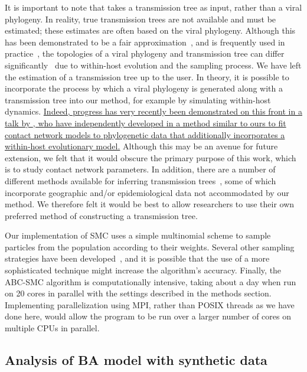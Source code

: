 It is important to note that  takes a transmission tree as
input, rather than a viral phylogeny. In reality, true transmission trees are
not available and must be estimated; these estimates are often based on the
viral phylogeny. Although this has been demonstrated to be a fair
approximation~\autocite[e.g.][]{leitner1996accurate}, and is frequently used in
practice~\autocite[e.g.][]{stadler2013uncovering}, the topologies of a viral
phylogeny and transmission tree can differ
significantly~\autocite{ypma2013relating, hall2015epidemic} due to within-host
evolution and the sampling process. We have left the estimation of a
transmission tree up to the user. In theory, it is possible to incorporate the
process by which a viral phylogeny is generated along with a transmission tree
into our method, for example by simulating within-host dynamics. {\color{blue}
\uline{Indeed, progress has very recently been demonstrated on this front in a
talk by \citeauthor{giardina2016inference}, who have independently developed in
a method similar to ours to fit contact network models to phylogenetic data
that additionally incorporates a within-host evolutionary model.}} Although
this may be an avenue for future extension, we felt that it would obscure the
primary purpose of this work, which is to study contact network parameters. In
addition, there are a number of different methods available for inferring
transmission trees~\autocite{didelot2014bayesian, ypma2012unravelling,
jombart2011reconstructing, cottam2008integrating, hall2015epidemic}, some of
which incorporate geographic and/or epidemiological data not accommodated by
our method. We therefore felt it would be best to allow researchers to use
their own preferred method of constructing a transmission tree.

Our implementation of \gls{SMC} uses a simple multinomial scheme to sample
particles from the population according to their weights. Several other
sampling strategies have been developed~\autocite{douc2005comparison}, and it
is possible that the use of a more sophisticated technique might increase the
algorithm's accuracy. Finally, the \gls{ABC}-\gls{SMC} algorithm is
computationally intensive, taking about a day when run on 20 cores in parallel
with the settings described in the methods section. Implementing
parallelization using MPI, rather than POSIX threads as we have done here,
would allow the program to be run over a larger number of cores on multiple
CPUs in parallel.

\subsection{Analysis of \acrlong{BA} model with synthetic data}

